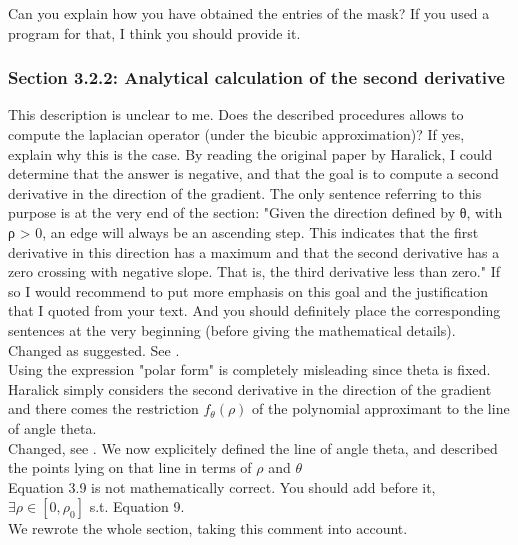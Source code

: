 \documentclass[a4paper,10pt]{report}
\begin{document}
\que Can you explain how you have obtained the entries of the mask? If you used a program for that, I think you should provide it.\\


\subsubsection{Section 3.2.2: Analytical calculation of the second derivative}

\que This description is unclear to me. Does the described procedures allows to
compute the laplacian operator (under the bicubic approximation)? If yes,
explain why this is the case. By reading the original paper by Haralick, I
could determine that the answer is negative, and that the goal is to compute a second derivative in the direction of the gradient. The only sentence referring to this purpose is at the very end of the section:
"Given the direction defined by θ, with ρ > 0, an edge will always be an
ascending step. This indicates that the first derivative in this direction has
a maximum and that the second derivative has a zero crossing with negative
slope. That is, the third derivative less than zero."
If so I would recommend to put more emphasis on this goal and the justification that I quoted from your text. And you should definitely place the
corresponding sentences at the very beginning (before giving the mathematical details).\\

\ans Changed as suggested. See .\\

\que Using the expression "polar form" is completely misleading since theta is
fixed. Haralick simply considers the second derivative in the direction of the
gradient and there comes the restriction $f_\theta(\rho)$ of the polynomial
approximant to the line of angle theta.\\

\ans Changed, see . We now explicitely defined the line of angle theta, and described the points lying on that line in terms of $\rho$ and $\theta$\\

\que Equation 3.9 is not mathematically correct. You should add before it, $\exists
\rho\in[0,\rho_0]$ s.t. Equation 9.\\

\ans We rewrote the whole section, taking this comment into account.\\
\end{document}
